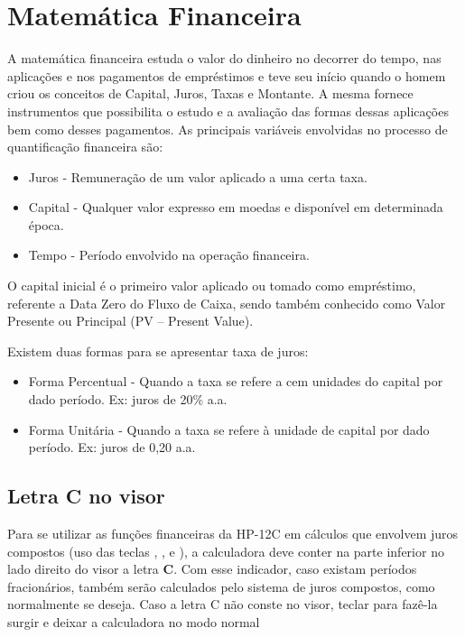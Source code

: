\clearpage
\section*{Matemática Financeira}
A matemática financeira estuda o valor do dinheiro no decorrer do tempo, nas aplicações e nos pagamentos de empréstimos e teve seu início quando o homem criou os conceitos de Capital, Juros, Taxas e Montante. A mesma fornece instrumentos que possibilita o estudo e a avaliação das formas dessas aplicações bem como desses pagamentos. As principais variáveis envolvidas no processo de quantificação financeira são: \vspace{-1em}
\begin{itemize}
	\item Juros - Remuneração de um valor aplicado a uma certa taxa.
	\item Capital - Qualquer valor expresso em moedas e disponível em determinada época.
	\item Tempo - Período envolvido na operação financeira.
\end{itemize}

O capital inicial é o primeiro valor aplicado ou tomado como empréstimo, referente a Data Zero do Fluxo de Caixa, sendo também conhecido como Valor Presente ou Principal (PV – Present Value).

Existem duas formas para se apresentar taxa de juros: \vspace{-1em}
\begin{itemize}
	\item Forma Percentual - Quando a taxa se refere a cem unidades do capital por dado período. Ex: juros de 20\% a.a.
	\item Forma Unitária - Quando a taxa se refere à unidade de capital por dado período. Ex: juros de 0,20 a.a.
\end{itemize}

\subsection*{Letra C no visor}
Para se utilizar as funções financeiras da HP-12C em cálculos que envolvem juros compostos (uso das teclas , ,  e ), a calculadora deve conter na parte inferior no lado direito do visor a letra \textbf{C}. Com esse indicador, caso existam períodos fracionários, também serão calculados pelo sistema de juros compostos, como normalmente se deseja. Caso a letra C não conste no visor, teclar   para fazê-la surgir e deixar a calculadora no modo normal

